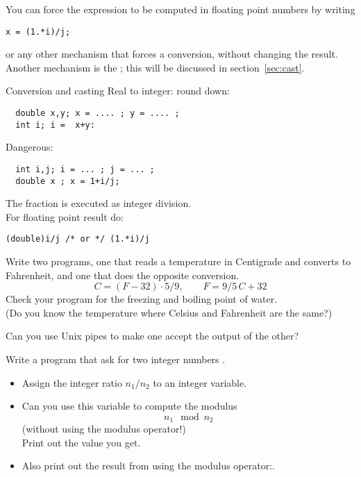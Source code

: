 You can force the expression to be computed in floating point numbers
by writing
\begin{verbatim}
x = (1.*i)/j;
\end{verbatim}
or any other mechanism that forces a conversion, without changing the
result.  Another mechanism is the ; this will be
discussed in section~\ref{sec:cast}.

\begin{slide}{Conversion and casting}
  \label{sl:convert-cast}
  Real to integer: round down:
\begin{verbatim}
  double x,y; x = .... ; y = .... ;
  int i; i =  x+y:
\end{verbatim}
Dangerous:
\begin{verbatim}
  int i,j; i = ... ; j = ... ; 
  double x ; x = 1+i/j;
\end{verbatim}
The fraction is executed as integer division.\\
For floating point result do:
\begin{verbatim}
(double)i/j /* or */ (1.*i)/j
\end{verbatim}
\end{slide}

\begin{exercise}
  \label{ex:C2F}
  Write two programs, one that reads a temperature in Centigrade and
  converts to Fahrenheit, and one that does the opposite conversion.
  \[ C = (F-32)\cdot 5/9,\qquad F = 9/5\,C+32 \]
  Check your program for the freezing and boiling point of water.\\
  (Do you know the temperature where Celsius and Fahrenheit are the
  same?)
  
  Can you use Unix pipes to make one accept the output of the other?
\end{exercise}

\begin{exercise}
  \label{ex:modulus}
  Write a program that ask for two integer numbers .
  \begin{itemize}
  \item Assign the integer ratio $n_1/n_2$ to an integer variable.
  \item Can you use this variable to compute the modulus
    \[ n_1\mod n_2 \]
    (without using the  modulus operator!)\\
    Print out the value you get.
  \item Also print out the result from using the modulus operator:.
  \end{itemize}
\end{exercise}

